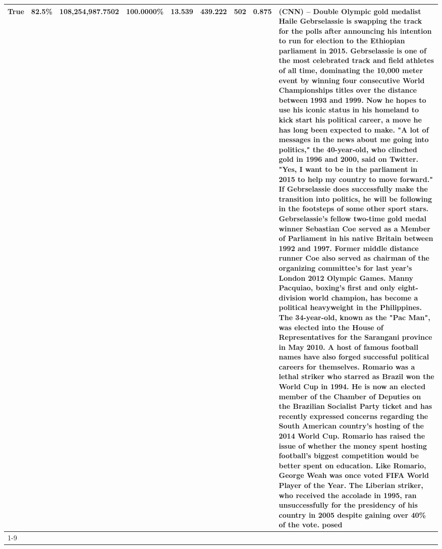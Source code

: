 \begin{table}[H]
{\begin{tabular}{lllrlllll}
True & 82.5\% & 108,254,987.7502 & \bfseries \color{red} 100.0000\% & 13.539 & 439.222 & 502 & 0.875 & (CNN) -- Double Olympic gold medalist Haile Gebrselassie is swapping the track for the polls after announcing his intention to run for election to the Ethiopian parliament in 2015. Gebrselassie is one of the most celebrated track and field athletes of all time, dominating the 10,000 meter event by winning four consecutive World Championships titles over the distance between 1993 and 1999. Now he hopes to use his iconic status in his homeland to kick start his political career, a move he has long been expected to make. "A lot of messages in the news about me going into politics," the 40-year-old, who clinched gold in 1996 and 2000, said on Twitter. "Yes, I want to be in the parliament in 2015 to help my country to move forward." If Gebrselassie does successfully make the transition into politics, he will be following in the footsteps of some other sport stars. Gebrselassie's fellow two-time gold medal winner Sebastian Coe served as a Member of Parliament in his native Britain between 1992 and 1997. Former middle distance runner Coe also served as chairman of the organizing committee's for last year's London 2012 Olympic Games. Manny Pacquiao, boxing's first and only eight-division world champion, has become a political heavyweight in the Philippines. The 34-year-old, known as the "Pac Man", was elected into the House of Representatives for the Sarangani province in May 2010. A host of famous football names have also forged successful political careers for themselves. Romario was a lethal striker who starred as Brazil won the World Cup in 1994. He is now an elected member of the Chamber of Deputies on the Brazilian Socialist Party ticket and has recently expressed concerns regarding the South American country's hosting of the 2014 World Cup. Romario has raised the issue of whether the money spent hosting football's biggest competition would be better spent on education. Like Romario, George Weah was once voted FIFA World Player of the Year. The Liberian striker, who received the accolade in 1995, ran unsuccessfully for the presidency of his country in 2005 despite gaining over 40\% of the vote. posed \\
\cline{1-9}

\end{tabular}}
\end{table}
